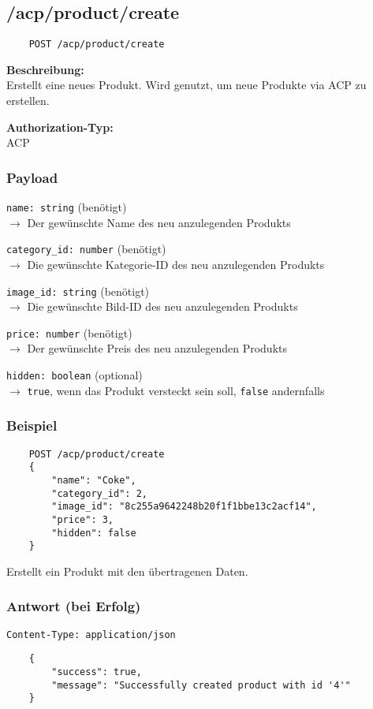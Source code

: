 \subsection{/acp/product/create}

\begin{lstlisting}
    POST /acp/product/create
\end{lstlisting}

\textbf{Beschreibung:} \\
Erstellt eine neues Produkt. Wird genutzt, um neue Produkte via ACP zu erstellen.

\textbf{Authorization-Typ:} \\
ACP

\subsubsection{Payload}

\lstinline{name: string} (benötigt) \\
$\rightarrow$ Der gewünschte Name des neu anzulegenden Produkts

\lstinline{category_id: number} (benötigt) \\
$\rightarrow$ Die gewünschte Kategorie-ID des neu anzulegenden Produkts

\lstinline{image_id: string} (benötigt) \\
$\rightarrow$ Die gewünschte Bild-ID des neu anzulegenden Produkts

\lstinline{price: number} (benötigt) \\
$\rightarrow$ Der gewünschte Preis des neu anzulegenden Produkts

\lstinline{hidden: boolean} (optional) \\
$\rightarrow$ \lstinline{true}, wenn das Produkt versteckt sein soll, \lstinline{false} andernfalls

\subsubsection{Beispiel}

\begin{lstlisting}
    POST /acp/product/create
    {
        "name": "Coke",
        "category_id": 2,
        "image_id": "8c255a9642248b20f1f1bbe13c2acf14",
        "price": 3,
        "hidden": false
    }
\end{lstlisting}

Erstellt ein Produkt mit den übertragenen Daten.

\subsubsection{Antwort (bei Erfolg)}

\lstinline{Content-Type: application/json}
\begin{lstlisting}
    {
        "success": true, 
        "message": "Successfully created product with id '4'"
    }
\end{lstlisting}